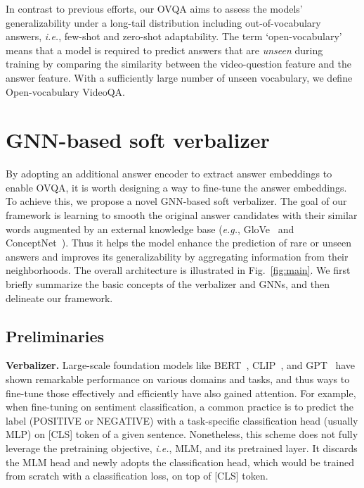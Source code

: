 \documentclass[10pt,twocolumn,letterpaper]{article}
\begin{document}
In contrast to previous efforts, our OVQA aims to assess the models' generalizability under a long-tail distribution including out-of-vocabulary answers, \textit{i.e.}, few-shot and zero-shot adaptability.
The term `open-vocabulary' means that a model is required to predict answers that are \textit{unseen} during training by comparing the similarity between the video-question feature and the answer feature.
With a sufficiently large number of unseen vocabulary, we define Open-vocabulary VideoQA.  \section{GNN-based soft verbalizer}

By adopting an additional answer encoder to extract answer embeddings to enable OVQA, it is worth designing a way to fine-tune the answer embeddings.
To achieve this, we propose a novel GNN-based soft verbalizer.
The goal of our framework is learning to smooth the original answer candidates with their similar words augmented by an external knowledge base (\textit{e.g.}, GloVe~\cite{pennington2014glove} and ConceptNet~\cite{speer2017conceptnet}).
Thus it helps the model enhance the prediction of rare or unseen answers and improves its generalizability by aggregating information from their neighborhoods.
The overall architecture is illustrated in Fig.~\ref{fig:main}.
We first briefly summarize the basic concepts of the verbalizer and GNNs, and then delineate our framework.


\subsection{Preliminaries}
\label{subsec:preliminaries}

\noindent \textbf{Verbalizer.}
Large-scale foundation models like BERT~\cite{devlin2018bert}, CLIP~\cite{radford2021learning}, and GPT~\cite{brown2020language} have shown remarkable performance on various domains and tasks, and thus ways to fine-tune those effectively and efficiently have also gained attention.
For example, when fine-tuning on sentiment classification, a common practice is to predict the label (POSITIVE or NEGATIVE) with a task-specific classification head (usually MLP) on [CLS] token of a given sentence.
Nonetheless, this scheme does not fully leverage the pretraining objective, \textit{i.e.}, MLM, and its pretrained layer. 
It discards the MLM head and newly adopts the classification head, which would be trained from scratch with a classification loss, on top of [CLS] token.
\end{document}

